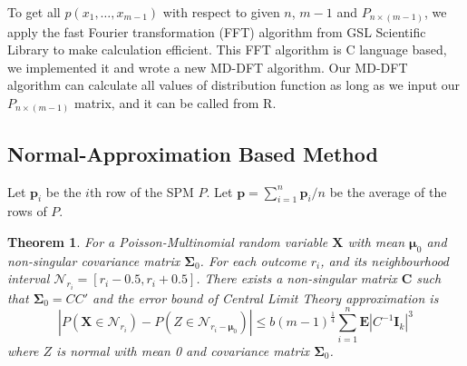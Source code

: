 \documentclass[12pt]{article}
\newcommand{\EE}{\mathbf{E}}
\newcommand{\pvec}{\boldsymbol{p}}
\newtheorem{thm}{Theorem}
\begin{document}
To get all $p(x_1,\dots,x_{m-1})$ with respect to given $n$, $m-1$ and $P_{n \times (m-1)}$, we apply the fast Fourier transformation (FFT) algorithm  from GSL Scientific Library to make calculation efficient. This FFT algorithm is C language based, we implemented it and wrote a new MD-DFT algorithm. Our MD-DFT algorithm can calculate all values of distribution function as long as we input our $P_{n\times (m-1)}$ matrix, and it can be called from R.



\subsection{Normal-Approximation Based Method}
Let $\pvec_i$ be the $i$th row of the SPM $P$. Let $\pvec=\sum_{i=1}^n\pvec_i/n$ be the average of the rows of $P$.


\begin{thm}
For a Poisson-Multinomial random variable $\boldsymbol{X}$ with mean $\boldsymbol{\mu}_0$ and non-singular covariance matrix $\boldsymbol{\Sigma}_0$. For each outcome $r_i$, and its neighbourhood interval $\mathcal{N}_{r_i} = [r_i-0.5,r_i+0.5]$. There exists a non-singular matrix $\boldsymbol{C}$ such that $\boldsymbol{\Sigma}_0 = CC'$ and the error bound of Central Limit Theory approximation is
\begin{equation*}
    |P(\boldsymbol{X} \in \mathcal{N}_{r_i}) - P(Z \in \mathcal{N}_{r_i-\boldsymbol{\mu}_0})| \leq b (m-1)^{\frac{1}{4}} \sum_{i=1}^{n}\EE|C^{-1}\boldsymbol{I}_{k}|^3
\end{equation*}
where $Z$ is normal with mean 0 and covariance matrix $\boldsymbol{\Sigma}_0$.
\end{thm}
\end{document}

